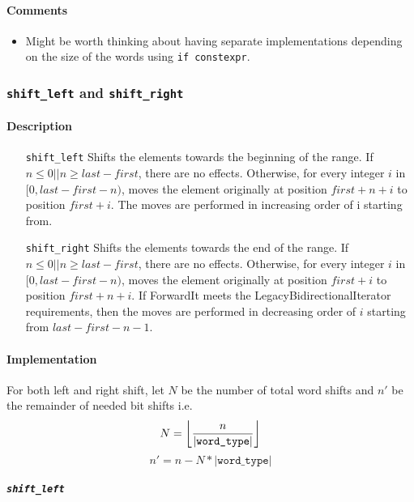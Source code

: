 \documentclass[letterpaper, 8pt, twocolumn]{article}
\DeclarePairedDelimiter\floor{\lfloor}{\rfloor}
\begin{document}
\paragraph{Comments}
\begin{itemize}
    \item Might be worth thinking about having separate implementations 
        depending on the size of the words using \texttt{if constexpr}.
\end{itemize}

\subsubsection{\texttt{shift\_left} and \texttt{shift\_right}}
\label{subsubsec:shift}
\paragraph{Description}
\begin{itemize}
    \item[\texttt{shift\_left}] Shifts the elements towards the beginning of the 
            range. If $n \leq 0 || n \geq last - first$, there are no effects. 
            Otherwise, for every integer $i$ in $[0, last - first - n)$, moves the 
            element originally at position $first + n + i$ to position $first + i$. 
            The moves are performed in increasing order of i starting from.
    \item[\texttt{shift\_right}] Shifts the elements towards the end of the 
        range. If $n \leq 0 || n \geq last - first$, there are no effects. Otherwise, 
        for every integer $i$ in $[0, last - first - n)$, moves the element 
        originally at position $first + i$ to position $first + n + i$. If ForwardIt 
        meets the LegacyBidirectionalIterator requirements, then the moves are 
        performed in decreasing order of $i$ starting from $last - first - n - 1$.
\end{itemize}

\paragraph{Implementation}
For both left and right shift, let $N$ be the number of total word shifts and 
$n'$ be the remainder of needed bit shifts i.e.
$$N=\floor*{\frac{n}{|\texttt{word\_type}|}}$$ $$n'=n-N*|\texttt{word\_type}|$$
\subparagraph{\texttt{shift\_left}}
\end{document}

